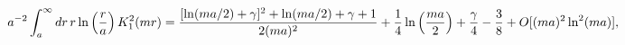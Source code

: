 \begin{equation}
\label{Eq_0409}
a^{-2} \int^{\infty}_a dr \, r \ln\left(\frac{r}{a}\right) K^2_1(mr)\\[3mm]
  = \frac{[\ln(ma/2) + \gamma]^2 + \ln (ma/2) + \gamma + 1}{2(ma)^2}
  + \frac{1}{4} \ln\left(\frac{ma}{2}\right)
  + \frac{\gamma}{4} - \frac{3}{8} + O[(ma)^2\ln^2(ma)],
\end{equation}

